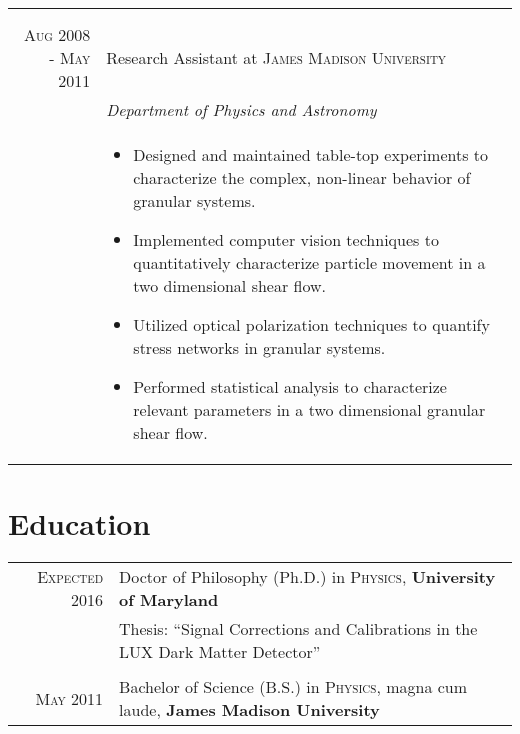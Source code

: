 \documentclass[a4paper,10pt]{article}
\begin{document}
\begin{tabular}{r|p{11cm}}
{ }\\
 \multicolumn{2}{c}{} \\
\textsc{Aug 2008 - May 2011} & Research Assistant at \textsc{James Madison University}\\&\emph{Department of Physics and Astronomy}\\&\footnotesize{
\begin{itemize}

\item Designed and maintained table-top experiments to characterize the complex, non-linear behavior of granular systems.
\item Implemented computer vision techniques to quantitatively characterize particle movement in a two dimensional shear flow.
\item Utilized optical polarization techniques to quantify stress networks in granular systems.
\item Performed statistical analysis to characterize relevant parameters in a two dimensional granular shear flow.

\end{itemize}
}\\
\end{tabular}

\section{Education}
\begin{tabular}{rl}	
 \textsc{Expected} 2016 & Doctor of Philosophy (Ph.D.) in \textsc{Physics}, \textbf{University of Maryland}\\
& Thesis: ``Signal Corrections and Calibrations in the LUX Dark Matter Detector'' \\&\\
\textsc{May} 2011& Bachelor of Science (B.S.) in \textsc{Physics}, magna cum laude,  \textbf{James Madison University} 
\end{tabular}

\end{document}
